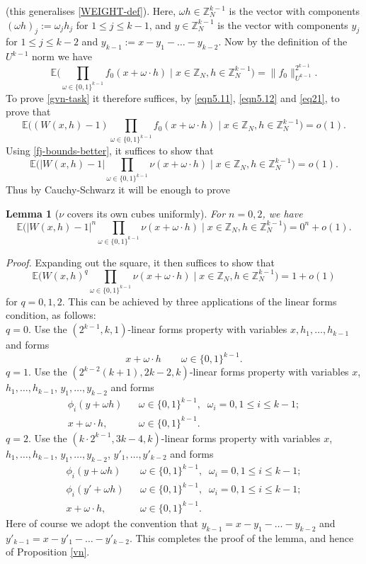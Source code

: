 \documentclass[12pt,a4paper,reqno]{amsart}
\numberwithin{equation}{section}
\theoremstyle{plain}
\newtheorem{lemma}[subsection]{Lemma}
\theoremstyle{definition}
\renewcommand{\leq}{\leqslant}
\def\Z{{\mathbb Z}}
\def\E{{\mathbb E}}
\def\proof{\noindent\textit{Proof. }}
\def\endproof{\hfill{\usebox{\proofbox}}}
\begin{document}
(this generalises \eqref{WEIGHT-def}).
Here, $\omega h \in \Z_N^{k-1}$ is the vector with components $(\omega h)_j := \omega_j h_j$ for $1 \leq j \leq k-1$,
and $y \in \Z_N^{k-1}$ is the vector with components $y_j$ for $1 \leq j \leq k-2$ and $y_{k-1} := x - y_1 - \ldots - y_{k-2}$.
Now by the definition of the $U^{k-1}$ norm we have
\[
\E\bigg( \prod_{\omega \in \{0,1\}^{k-1}} f_0(x + \omega \cdot h) \; \bigg| \; 
x \in \mathbb{Z}_N, h \in \mathbb{Z}_N^{k-1} \bigg) = \| f_0 \|_{U^{k-1}}^{2^{k-1}}.\]
To prove \eqref{gvn-task} it therefore suffices, by \eqref{eqn5.11}, \eqref{eqn5.12} and \eqref{eq21}, to prove that
\[ \E\bigg( (W(x,h)-1) \prod_{\omega \in \{0,1\}^{k-1}} f_0(x + \omega \cdot h) \; \bigg| \; 
x \in \mathbb{Z}_N, h \in \mathbb{Z}_N^{k-1} \bigg) = o(1).\]
Using \eqref{fj-bounds-better}, it suffices to show that
\[ \E\bigg( |W(x,h)-1| \prod_{\omega \in \{0,1\}^{k-1}} \nu(x + \omega \cdot h) \; \bigg| \; 
x \in \mathbb{Z}_N, h \in \mathbb{Z}_N^{k-1} \bigg) = o(1).\]
Thus by Cauchy-Schwarz it will be enough to prove

\begin{lemma}[$\nu$ covers its own cubes uniformly]\label{mu-cubes}
For $n=0,2$, we 
have \[\E\bigg( |W(x,h)-1|^n \prod_{\omega \in \{0,1\}^{k-1}} \nu(x + \omega \cdot h)\; \bigg| \; 
x \in \mathbb{Z}_N, h \in \mathbb{Z}_N^{k-1} \bigg) = 0^n + o(1).\]
\end{lemma}

\proof Expanding out the square, it then suffices to show that
\[  \E\bigg( W(x,h)^q \prod_{\omega \in \{0,1\}^{k-1}} \nu(x + \omega \cdot h) \; \bigg| \;
x \in \mathbb{Z}_N, h \in \mathbb{Z}_N^{k-1} \bigg) = 1 + o(1)\]
for $q=0,1,2$. This can be achieved by three applications of the linear forms condition, as follows:\\[11pt]
$q = 0$. Use the $(2^{k-1},k,1)$-linear forms property with variables $x,h_1,\dots,h_{k-1}$ and forms
\[ x + \omega \cdot h \qquad \omega \in \{0,1\}^{k-1}.\]
$q = 1$. Use the $(2^{k-2}(k+1), 2k - 2, k)$-linear forms property with variables $x$, $h_1,\dots,h_{k-1}$, $y_1,\dots,y_{k-2}$ and forms
\begin{eqnarray*} \phi_i(y + \omega h) & & \omega \in \{0,1\}^{k-1}, \;\; \omega_i = 0, 1 \leq i \leq k - 1;\\
 x + \omega \cdot h, && \omega \in \{0,1\}^{k-1}.\end{eqnarray*}
$q = 2$. Use the $(k\cdot 2^{k-1}, 3k - 4, k)$-linear forms property with variables $x$, $h_1,\dots,h_{k-1}$, $y_1,\dots,y_{k-2}$, $y'_1,\dots,y'_{k-2}$ and forms
\begin{eqnarray*} \phi_i(y + \omega h) && \omega \in \{0,1\}^{k-1},\;\; \omega_i = 0, 1 \leq i \leq k - 1;\\
 \phi_i(y' + \omega h) && \omega \in \{0,1\}^{k-1},\;\; \omega_i = 0, 1 \leq i \leq k - 1;\\
 x + \omega \cdot h, && \omega \in \{0,1\}^{k-1}.\end{eqnarray*}
Here of course we adopt the convention that 
$y_{k-1} = x - y_1 - \ldots - y_{k-2}$ and
$y'_{k-1} = x - y'_1 - \ldots - y'_{k-2}$.
This completes the proof of the lemma, and hence of Proposition \ref{vn}.\endproof
\end{document}
